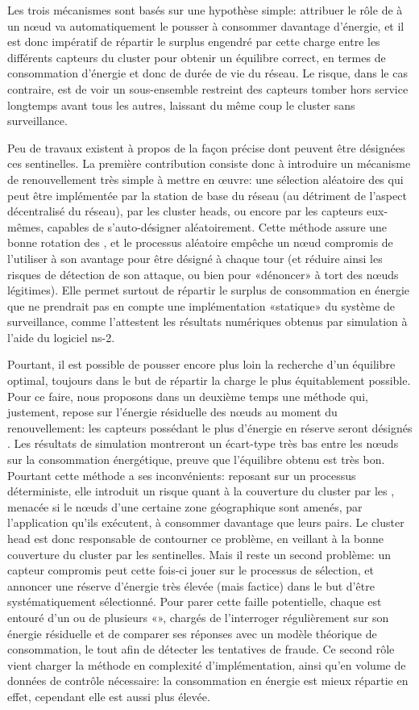 Les trois mécanismes sont basés sur une hypothèse simple: attribuer le rôle de \cnt à un nœud va automatiquement le pousser à consommer davantage d'énergie, et il est donc impératif de répartir le surplus engendré par cette charge entre les différents capteurs du cluster pour obtenir un équilibre correct, en termes de consommation d'énergie et donc de durée de vie du réseau.
Le risque, dans le cas contraire, est de voir un sous-ensemble restreint des capteurs tomber hors service longtemps avant tous les autres, laissant du même coup le cluster sans surveillance.

Peu de travaux existent à propos de la façon précise dont peuvent être désignées ces sentinelles.
La première contribution consiste donc à introduire un mécanisme de renouvellement très simple à mettre en œuvre: une sélection aléatoire des \cnst qui peut être implémentée par la station de base du réseau (au détriment de l'aspect décentralisé du réseau), par les cluster heads, ou encore par les capteurs eux-mêmes, capables de s'auto-désigner aléatoirement.
Cette méthode assure une bonne rotation des \cnst, et le processus aléatoire empêche un nœud compromis de l'utiliser à son avantage pour être désigné à chaque tour (et réduire ainsi les risques de détection de son attaque, ou bien pour «dénoncer» à tort des nœuds légitimes).
Elle permet surtout de répartir le surplus de consommation en énergie que ne prendrait pas en compte une implémentation «statique» du système de surveillance, comme l'attestent les résultats numériques obtenus par simulation à l'aide du logiciel \textsf{ns-2}.

Pourtant, il est possible de pousser encore plus loin la recherche d'un équilibre optimal, toujours dans le but de répartir la charge le plus équitablement possible.
Pour ce faire, nous proposons dans un deuxième temps une méthode qui, justement, repose sur l'énergie résiduelle des nœuds au moment du renouvellement: les capteurs possédant le plus d'énergie en réserve seront désignés \cnst.
Les résultats de simulation montreront un écart-type très bas entre les nœuds sur la consommation énergétique, preuve que l'équilibre obtenu est très bon.
Pourtant cette méthode a ses inconvénients: reposant sur un processus déterministe, elle introduit un risque quant à la couverture du cluster par les \cnst, menacée si le nœuds d'une certaine zone géographique sont amenés, par l'application qu'ils exécutent, à consommer davantage que leurs pairs.
Le cluster head est donc responsable de contourner ce problème, en veillant à la bonne couverture du cluster par les sentinelles.
Mais il reste un second problème: un capteur compromis peut cette fois-ci jouer sur le processus de sélection, et annoncer une réserve d'énergie très élevée (mais factice) dans le but d'être systématiquement sélectionné.
Pour parer cette faille potentielle, chaque \cnt est entouré d'un ou de plusieurs «\vnst», chargés de l'interroger régulièrement sur son énergie résiduelle et de comparer ses réponses avec un modèle théorique de consommation, le tout afin de détecter les tentatives de fraude.
Ce second rôle vient charger la méthode en complexité d'implémentation, ainsi qu'en volume de données de contrôle nécessaire: la consommation en énergie est mieux répartie en effet, cependant elle est aussi plus élevée.

